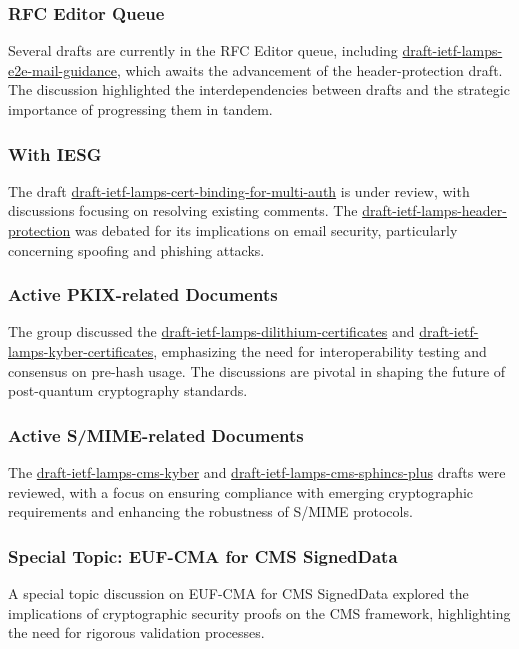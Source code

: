 \documentclass{article}
\begin{document}
\subsubsection{RFC Editor Queue}
Several drafts are currently in the RFC Editor queue, including \href{https://datatracker.ietf.org/doc/html/draft-ietf-lamps-e2e-mail-guidance}{draft-ietf-lamps-e2e-mail-guidance}, which awaits the advancement of the header-protection draft. The discussion highlighted the interdependencies between drafts and the strategic importance of progressing them in tandem.

\subsubsection{With IESG}
The draft \href{https://datatracker.ietf.org/doc/html/draft-ietf-lamps-cert-binding-for-multi-auth}{draft-ietf-lamps-cert-binding-for-multi-auth} is under review, with discussions focusing on resolving existing comments. The \href{https://datatracker.ietf.org/doc/html/draft-ietf-lamps-header-protection}{draft-ietf-lamps-header-protection} was debated for its implications on email security, particularly concerning spoofing and phishing attacks.

\subsubsection{Active PKIX-related Documents}
The group discussed the \href{https://datatracker.ietf.org/doc/html/draft-ietf-lamps-dilithium-certificates}{draft-ietf-lamps-dilithium-certificates} and \href{https://datatracker.ietf.org/doc/html/draft-ietf-lamps-kyber-certificates}{draft-ietf-lamps-kyber-certificates}, emphasizing the need for interoperability testing and consensus on pre-hash usage. The discussions are pivotal in shaping the future of post-quantum cryptography standards.

\subsubsection{Active S/MIME-related Documents}
The \href{https://datatracker.ietf.org/doc/html/draft-ietf-lamps-cms-kyber}{draft-ietf-lamps-cms-kyber} and \href{https://datatracker.ietf.org/doc/html/draft-ietf-lamps-cms-sphincs-plus}{draft-ietf-lamps-cms-sphincs-plus} drafts were reviewed, with a focus on ensuring compliance with emerging cryptographic requirements and enhancing the robustness of S/MIME protocols.

\subsubsection{Special Topic: EUF-CMA for CMS SignedData}
A special topic discussion on EUF-CMA for CMS SignedData explored the implications of cryptographic security proofs on the CMS framework, highlighting the need for rigorous validation processes.
\end{document}
